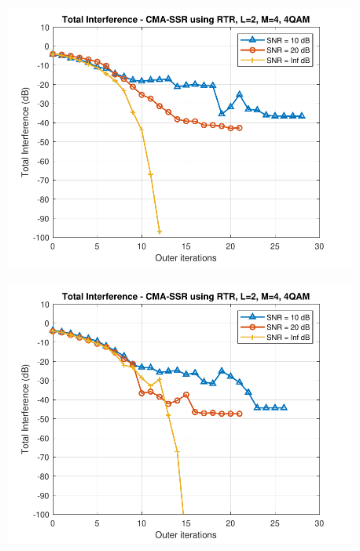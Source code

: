 \begin{figure}
\begin{subfigure}[b]{0.45\textwidth}
		\includegraphics[width=\linewidth]{./figs/BF_RTR_TI_4QAM_L=2_M=4_K=200.pdf}
		\label{fig:rtr_ti200}
	\end{subfigure}
	\begin{subfigure}[b]{0.45\textwidth}
		\includegraphics[width=\linewidth]{./figs/BF_RTR_TI_4QAM_L=2_M=4_K=1000.pdf}
		\label{fig:rtr_ti1000}
	\end{subfigure}
	\begin{subfigure}[b]{0.45\textwidth}

\end{subfigure}
\end{figure}
